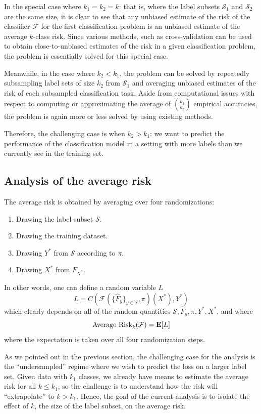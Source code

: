\documentclass[12pt]{article}
\begin{document}
In the special case where $k_1 = k_2 = k$: that is, where the label
subsets $\mathcal{S}_1$ and $\mathcal{S}_2$ are the same size, it is
clear to see that any unbiased estimate of the risk of the classifier
$\mathcal{F}$ for the first classification problem is an unbiased
estimate of the average $k$-class risk.  Since various methods, such
as cross-validation can be used to obtain close-to-unbiased estimates
of the risk in a given classification problem, the problem is
essentially solved for this special case.

Meanwhile, in the case where $k_2 < k_1$, the problem can be solved by
repeatedly subsampling label sets of size $k_2$ from $\mathcal{S}_1$
and averaging unbiased estimates of the risk of each subsampled
classification task.  Aside from computational issues with respect to
computing or approximating the average of ${k_1}\choose{k_2}$
empirical accuracies, the problem is again more or less solved by
using existing methods.

Therefore, the challenging case is when $k_2 > k_1$: we want to
predict the performance of the classification model in a setting with
more labels than we currently see in the training set.

\subsection{Analysis of the average risk}

The average risk is obtained by averaging over four randomizations:
\begin{enumerate}
\item Drawing the label subset $\mathcal{S}$.
\item Drawing the training dataset.
\item Drawing $Y^*$ from $\mathcal{S}$ according to $\pi$.
\item Drawing $X^*$ from $F_{X^*}$.
\end{enumerate}

In other words, one can define a random variable $L$
\[
L = C(\mathcal{F}(\{\hat{F}_y\}_{y \in \mathcal{S}}, \pi)(X^*), Y^*)
\]
which clearly depends on all of the random quantities $\mathcal{S}, \hat{F}_y, \pi, Y^*, X^*$, and where
\[
\text{Average Risk}_k(\mathcal{F}) = \textbf{E}[L]
\]
where the expectation is taken over all four randomization steps.

As we pointed out in the previous section, the challenging case for
the analysis is the ``undersampled'' regime where we wish to predict
the loss on a larger label set.  Given data with $k_1$ classes, we
already have means to estimate the average risk for all $k \leq k_1$,
so the challenge is to understand how the risk will ``extrapolate'' to
$k > k_1$.  Hence, the goal of the current analysis is to isolate the
effect of $k$, the size of the label subset, on the average risk.
\end{document}
